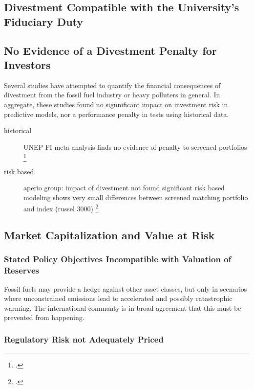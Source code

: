 



		\begin{samepage}
		\section {Divestment Compatible with the University's Fiduciary Duty}

	\subsection {No Evidence of a Divestment Penalty for Investors}
	
Several studies have attempted to quantify the financial consequences of divestment from the fossil fuel industry or heavy polluters in general. In aggregate, these studies found no signnificant impact on investment risk in predictive models, nor a performance penalty in tests using historical data.
\begin{description}
\item[historical] UNEP FI meta-analysis finds no evidence of penalty to screened portfolios \footcite{UNEPFI2007}
\item[risk based] aperio group: impact of divestment not found significant risk based modeling shows very small differences between screened matching portfolio and index (russel 3000) \footcite{Aperio2013}
\end{description}


		\subsection {Market Capitalization and Value at Risk}

\subsubsection {Stated Policy Objectives Incompatible with Valuation of Reserves}

Fossil fuels may provide a hedge against other asset classes, but only in scenarios where unconstrained emissions lead to accelerated and possibly catastrophic warming. The international communty is in broad agreement that this must be prevented from happening.
\end{samepage}

\subsubsection {Regulatory Risk not Adequately Priced} 

